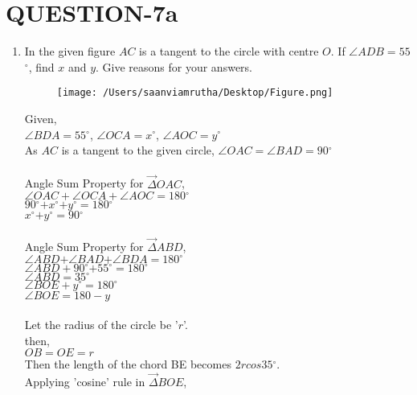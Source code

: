\documentclass[journal,12pt,twocolumn]{IEEEtran}
\renewcommand\thesection{\arabic{section}}
\begin{document}
\section{QUESTION-7a}
\begin{enumerate}[label=\thesection.\arabic*.,ref=\thesection.\theenumi]

\item In the given figure $AC$ is a tangent to the circle with centre $O$. If $\angle$$ADB=55$$^{\circ}$, find $x$ and $y$. Give reasons for your answers.\\
\begin{figure}[htbp]
\texttt{[image: /Users/saanviamrutha/Desktop/Figure.png]}
\label{fig}
\end{figure}

\solution 
Given,\\

 $\angle$$BDA=55$$^{\circ}$, $\angle$$OCA=x$$^{\circ}$, $\angle$$AOC=y$$^{\circ}$\\

As $AC$ is a tangent to the given circle, $\angle$$OAC=$$\angle$$BAD=90$$^{\circ}$\\
\\
Angle Sum Property for $\vec{\Delta}$$OAC$, \\
              $\angle$$OAC+$$\angle$$OCA+$$\angle$$AOC=$$180$$^{\circ}$ \\
               $90$$^{\circ}$$+x$$^{\circ}$$+y$$^{\circ}$$=180$$^{\circ}$\\
               $x$$^{\circ}$$+y$$^{\circ}$$=90$$^{\circ}$\\ \\
               
Angle Sum Property for $\vec{\Delta}$$ABD$, \\   
               $\angle$$ABD$$+$$\angle$$BAD$$+$$\angle$$BDA$$=$$180$$^{\circ}$\\
               $\angle$$ABD+90$$^{\circ}$$+55$$^{\circ}$$=180$$^{\circ}$\\
               $\angle$$ABD=35$$^{\circ}$\\ 
                
                $\angle$$BOE+y$$^{\circ}$$=180$$^{\circ}$\\
                $\angle$$BOE=180-y$\\ \\
                Let the radius of the circle be '$r$'.\\
                then,\\
                $OB=OE=r$\\
                Then the length of the chord BE becomes $2rcos 35$$^{\circ}$.\\
                Applying 'cosine' rule in $\vec{\Delta}$$BOE$,\\ 
              

\end{enumerate}
\end{document}
